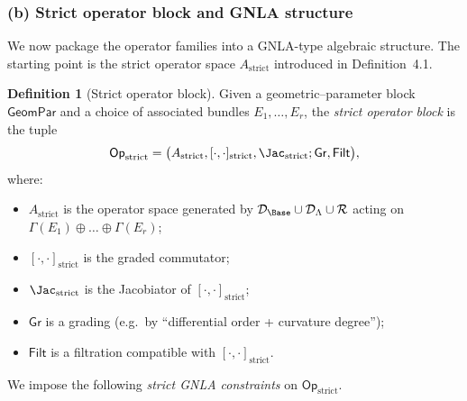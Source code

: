 \documentclass[11pt]{book}
\theoremstyle{plain}
\theoremstyle{definition}
\newtheorem{definition}[theorem]{Definition} \theoremstyle{remark}
\begin{document}
\subsubsection*{(b) Strict operator block and GNLA structure}

We now package the operator families into a GNLA-type algebraic
structure. The starting point is the strict operator space
$A_{\mathrm{strict}}$ introduced in Definition~4.1.

\begin{definition}[Strict operator block]
Given a geometric–parameter block $\mathsf{GeomPar}$ and a choice of
  associated bundles $E_1,\dots,E_r$, the \emph{strict operator block}
  is the tuple
  \[
     \mathsf{Op}_{\mathrm{strict}}
     =
     \bigl(
       A_{\mathrm{strict}},
       [\cdot,\cdot]_{\mathrm{strict}},
       \Jac_{\mathrm{strict}};
       \mathsf{Gr},\mathsf{Filt}
     \bigr),
  \]
  where:
  \begin{itemize}
    \item $A_{\mathrm{strict}}$ is the operator space generated by
          $\mathcal{D}_{\Base}\cup\mathcal{D}_{\Lambda}\cup\mathcal{R}$
          acting on $\Gamma(E_1)\oplus\dots\oplus\Gamma(E_r)$;
    \item $[\cdot,\cdot]_{\mathrm{strict}}$ is the graded commutator;
    \item $\Jac_{\mathrm{strict}}$ is the Jacobiator of
          $[\cdot,\cdot]_{\mathrm{strict}}$;
    \item $\mathsf{Gr}$ is a grading (e.g.\ by “differential order +
          curvature degree”);
    \item $\mathsf{Filt}$ is a filtration compatible with
          $[\cdot,\cdot]_{\mathrm{strict}}$.
  \end{itemize}
\end{definition}

We impose the following \emph{strict GNLA constraints} on
$\mathsf{Op}_{\mathrm{strict}}$.
\end{document}
